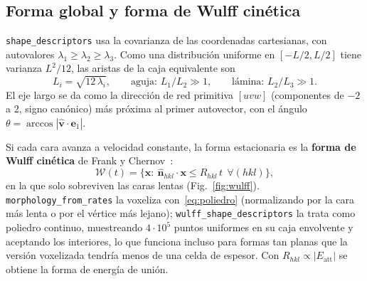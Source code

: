 \documentclass[11pt,a4paper]{article}
\newcommand{\code}[1]{\texttt{#1}}
\newcommand{\vect}[1]{\mathbf{#1}}
\newcommand{\Eatt}{E_{\mathrm{att}}}
\begin{document}
\subsection{Forma global y forma de Wulff cinética}

\code{shape\_descriptors} usa la covarianza de las coordenadas cartesianas, con autovalores
$\lambda_1\ge\lambda_2\ge\lambda_3$. Como una distribución uniforme en $[-L/2,L/2]$ tiene varianza
$L^2/12$, las aristas de la caja equivalente son
\begin{equation}
L_i=\sqrt{12\,\lambda_i},\qquad \text{aguja: } L_1/L_2\gg1,\qquad \text{lámina: } L_2/L_3\gg1 .
\label{eq:L}
\end{equation}
El eje largo se da como la dirección de red primitiva $[uvw]$ (componentes de $-2$ a $2$, signo
canónico) más próxima al primer autovector, con el ángulo $\theta=\arccos|\hat{\vect v}\cdot\vect e_1|$.

Si cada cara avanza a velocidad constante, la forma estacionaria es la \textbf{forma de Wulff cinética}
de Frank y Chernov~\cite{frank1958}:
\begin{equation}
\mathcal W(t)=\bigl\{\vect x:\ \hat{\vect n}_{hkl}\cdot\vect x\le R_{hkl}\,t\ \ \forall(hkl)\bigr\},
\label{eq:wulff}
\end{equation}
en la que solo sobreviven las caras lentas (Fig.~\ref{fig:wulff}). \code{morphology\_from\_rates} la
voxeliza con~\eqref{eq:poliedro} (normalizando por la cara más lenta o por el vértice más lejano);
\code{wulff\_shape\_descriptors} la trata como poliedro continuo, muestreando $4\cdot10^5$ puntos
uniformes en su caja envolvente y aceptando los interiores, lo que funciona incluso para formas tan
planas que la versión voxelizada tendría menos de una celda de espesor. Con
$R_{hkl}\propto|\Eatt|$ se obtiene la forma de energía de unión.
\end{document}
